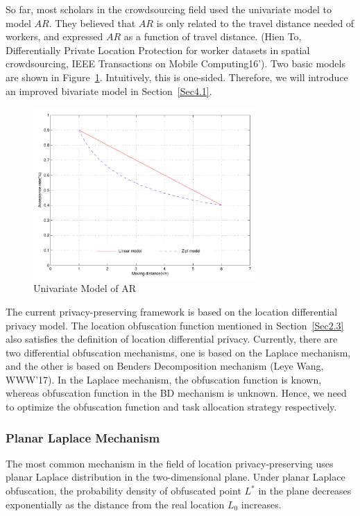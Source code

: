 So far, most scholars in the crowdsourcing field used the univariate model to model $AR$. They believed that $AR$ is only related to the travel distance needed of workers, and expressed $AR$ as a function of travel distance. (Hien To, Differentially Private Location Protection for worker datasets in spatial crowdsourcing, IEEE Transactions on Mobile Computing16'). Two basic models are shown in Figure~\ref{img:UniModel}. Intuitively, this is one-sided. Therefore, we will introduce an improved bivariate model in Section~\ref{Sec4.1}.

\begin{figure}
\includegraphics[width=8.5cm]{UniModel}
\caption{Univariate Model of AR}
\label{img:UniModel}
\end{figure}

The current privacy-preserving framework is based on the location differential privacy model. The location obfuscation function mentioned in Section~\ref{Sec2.3} also satisfies the definition of location differential privacy. Currently, there are two differential obfuscation mechanisms, one is based on the Laplace mechanism, and the other is based on Benders Decomposition mechanism (Leye Wang, WWW'17). In the Laplace mechanism, the obfuscation function is known, whereas obfuscation function in the BD mechanism is unknown. Hence, we need to optimize the obfuscation function and task allocation strategy respectively.

\subsubsection{Planar Laplace Mechanism}
The most common mechanism in the field of location privacy-preserving uses planar Laplace distribution in the two-dimensional plane. Under planar Laplace obfuscation, the probability density of obfuscated point $L^*$ in the plane decreases exponentially as the distance from the real location $L_0$ increases. 

